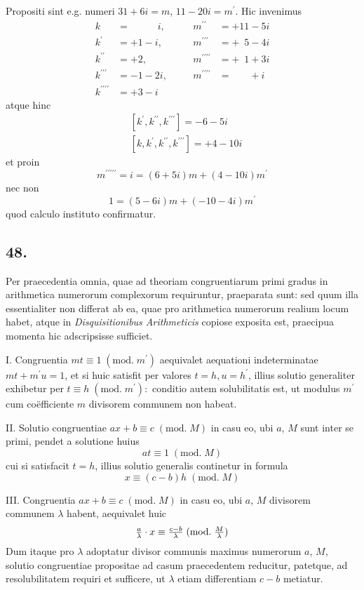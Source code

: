 \documentclass[twoside,12pt, showframe]{memoir}
\renewcommand{\pmod}[1]{\;(\textrm{mod.}\;#1)}
\let\oldfrac\frac
\def\frac#1#2{\mathchoice{\tfrac{#1}{#2}}{\oldfrac{#1}{#2}}{\genfrac{}{}{}{2}{#1}{#2\mathstrut}}{\genfrac{}{}{}{3}{#1}{#2\mathstrut}}}
\begin{document}
Propositi sint e.g. numeri \(31+6 i=m\), \(11-20 i=m^{\prime}\). Hic invenimus
\[\begin{array}{clccl}
k&=\phantom{+1-\;} i,&\quad& m^{\prime \prime}&=+11-5 i \\
k^{\prime}&=+1-i, &\quad& m^{\prime \prime \prime}&=+\phantom{0}5-4 i \\
k^{\prime \prime}&=+2, &\quad& m^{\prime \prime \prime \prime}&=+\phantom{0}1+3 i \\
k^{\prime \prime \prime}&=-1-2 i, &\quad& m^{\prime \prime \prime \prime}&=\phantom{+00}+i \\
k^{\prime \prime \prime \prime}&=+3-i &\quad&&
\end{array}\]
atque hinc
\[\begin{aligned}
& {\left[k^{\prime}, k^{\prime \prime}, k^{\prime \prime \prime}\right]=-6-5 i} \\
& {\left[k, k^{\prime}, k^{\prime \prime}, k^{\prime \prime \prime}\right]=+4-10 i}
\end{aligned}\]
et proin
\[m^{\prime \prime \prime \prime \prime}=i=(6+5 i) m+(4-10 i) m^{\prime}\]
nec non
\[1=(5-6 i) m+(-10-4 i) m^{\prime}\]
quod calculo instituto confirmatur.

\subsection*{48.}
 
Per praecedentia omnia, quae ad theoriam congruentiarum primi gradus in arithmetica numerorum complexorum requiruntur, praeparata sunt: sed quum illa\clearpage\noindent%
essentialiter non differat ab ea, quae pro arithmetica numerorum realium locum habet, atque in \textit{Disquisitionibus Arithmeticis} copiose exposita est, praecipua momenta hic adscripsisse sufficiet.
 
I. Congruentia \(m t \equiv 1\pmod{m^{\prime}}\) aequivalet aequationi indeterminatae \(m t+m^{\prime} u=1\), et si huic satisfit per valores \(t=h, u=h^{\prime}\), illius solutio generaliter exhibetur per \(t \equiv h\pmod{m^{\prime}}:\) conditio autem solubilitatis est, ut modulus \(m^{\prime}\) cum coëfficiente \(m\) divisorem communem non habeat.
 
II. Solutio congruentiae \(a x+b \equiv c\pmod{M}\) in casu eo, ubi \(a\), \(M\) sunt inter se primi, pendet a solutione huius
\[a t \equiv 1\pmod{M}\]
cui si satisfacit \(t=h\), illius solutio generalis continetur in formula
\[x \equiv(c-b) h\pmod{M}\]
 
III. Congruentia \(a x+b \equiv c\pmod{M}\) in casu eo, ubi \(a\), \(M\) divisorem communem \(\lambda\) habent, aequivalet huic
\[\frac{a}{\lambda} \cdot x \equiv \frac{c-b}{\lambda}\pmod{\frac{M}{\lambda}}\]
Dum itaque pro \(\lambda\) adoptatur divisor communis maximus numerorum \(a\), \(M\), solutio congruentiae propositae ad casum praecedentem reducitur, patetque, ad resolubilitatem requiri et sufficere, ut \(\lambda\) etiam differentiam \(c-b\) metiatur.
\end{document}
